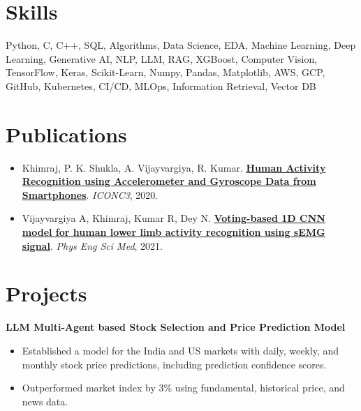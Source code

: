 \documentclass[a4paper,20pt]{article}
\begin{document}
\vspace{1pt}
\section{Skills}
	{Python, C, C++, SQL, Algorithms, Data Science, EDA, Machine Learning, Deep Learning, Generative AI, NLP, LLM, RAG, XGBoost, Computer Vision, TensorFlow, Keras, Scikit-Learn, Numpy, Pandas, Matplotlib, AWS, GCP, GitHub, Kubernetes, CI/CD, MLOps, Information Retrieval, Vector DB}

\vspace{1pt}
\section*{Publications}
\begin{itemize}[leftmargin=*]
    \item Khimraj, P. K. Shukla, A. Vijayvargiya, R. Kumar. \href{https://ieeexplore.ieee.org/document/9117456}{\textbf{Human Activity Recognition using Accelerometer and Gyroscope Data from Smartphones}}. \textit{ICONC3}, 2020.
    \vspace{-4pt}
    \item Vijayvargiya A, Khimraj, Kumar R, Dey N. \href{https://link.springer.com/article/10.1007/s13246-021-01071-6}{\textbf{Voting-based 1D CNN model for human lower limb activity recognition using sEMG signal}}. \textit{Phys Eng Sci Med}, 2021.
\end{itemize}

\vspace{1pt}
\section{Projects}
\noindent\textbf{LLM Multi-Agent based Stock Selection and Price Prediction Model}
\vspace{-2pt}
\begin{itemize}[label=$\circ$]
\item Established a model for the India and US markets with daily, weekly, and monthly stock price predictions, including prediction confidence scores.
\vspace{-4pt}
\item Outperformed market index by 3\% using fundamental, historical price, and news data.
\end{itemize}
\end{document}
